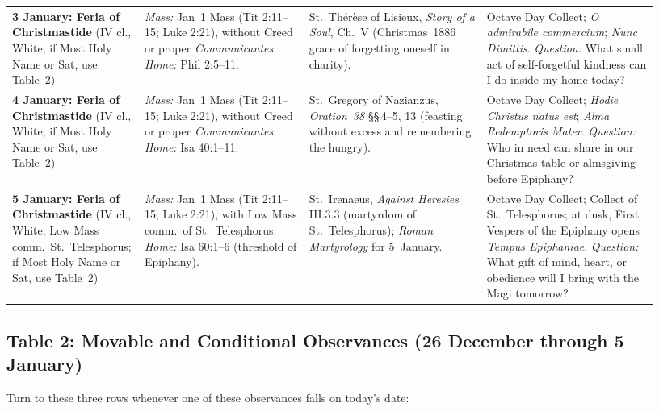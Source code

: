 {\begin{longtable}{>{\raggedright\arraybackslash}p{0.15\linewidth}>{\raggedright\arraybackslash}p{0.25\linewidth}>{\raggedright\arraybackslash}p{0.27\linewidth}>{\raggedright\arraybackslash}p{0.26\linewidth}}
\textbf{3 January: Feria of Christmastide} (IV cl., White; if Most Holy Name or Sat, use Table~2) & \textit{Mass:} Jan~1 Mass (Tit 2:11--15; Luke 2:21), without Creed or proper \textit{Communicantes}. \textit{Home:} Phil 2:5--11. & St.~Th\'er\`ese of Lisieux, \textit{Story of a Soul}, Ch.~V (Christmas~1886 grace of forgetting oneself in charity). & Octave Day Collect; \textit{O admirabile commercium}; \textit{Nunc Dimittis}. \textit{Question:} What small act of self-forgetful kindness can I do inside my home today?\\
\textbf{4 January: Feria of Christmastide} (IV cl., White; if Most Holy Name or Sat, use Table~2) & \textit{Mass:} Jan~1 Mass (Tit 2:11--15; Luke 2:21), without Creed or proper \textit{Communicantes}. \textit{Home:} Isa 40:1--11. & St.~Gregory of Nazianzus, \textit{Oration~38} \S\S\,4--5, 13 (feasting without excess and remembering the hungry). & Octave Day Collect; \textit{Hodie Christus natus est}; \textit{Alma Redemptoris Mater}. \textit{Question:} Who in need can share in our Christmas table or almsgiving before Epiphany?\\
\textbf{5 January: Feria of Christmastide} (IV cl., White; Low Mass comm.\ St.~Telesphorus; if Most Holy Name or Sat, use Table~2) & \textit{Mass:} Jan~1 Mass (Tit 2:11--15; Luke 2:21), with Low Mass comm.\ of St.~Telesphorus. \textit{Home:} Isa 60:1--6 (threshold of Epiphany). & St.~Irenaeus, \textit{Against Heresies} III.3.3 (martyrdom of St.~Telesphorus); \textit{Roman Martyrology} for 5~January. & Octave Day Collect; Collect of St.~Telesphorus; at dusk, First Vespers of the Epiphany opens \textit{Tempus Epiphaniae}. \textit{Question:} What gift of mind, heart, or obedience will I bring with the Magi tomorrow?\\
\bottomrule
\end{longtable}
}

\subsection{Table 2: Movable and Conditional Observances (26 December through 5 January)}

Turn to these three rows whenever one of these observances falls on today's
date:

